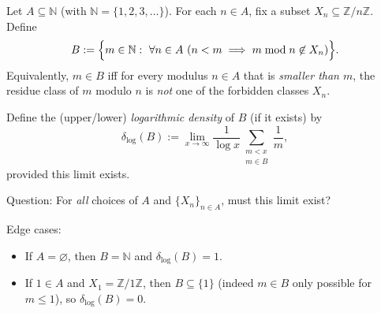 Let $A\subseteq\mathbb{N}$ (with $\mathbb{N}=\{1,2,3,\dots\}$). For each $n\in A$, fix a subset $X_n\subseteq \mathbb{Z}/n\mathbb{Z}$.
Define
\[
B := \Bigl\{ m\in\mathbb{N}:\ \forall n\in A\ (n<m\implies m\bmod n\not\in X_n)\Bigr\}.
\]
Equivalently, $m\in B$ iff for every modulus $n\in A$ that is \emph{smaller than $m$}, the residue class of $m$ modulo $n$ is \emph{not} one of the forbidden classes $X_n$.

Define the (upper/lower) \emph{logarithmic density} of $B$ (if it exists) by
\[
\delta_{\log}(B) := \lim_{x\to\infty}\frac{1}{\log x}\sum_{\substack{m<x\\m\in B}}\frac{1}{m},
\]
provided this limit exists.

Question: For \emph{all} choices of $A$ and $\{X_n\}_{n\in A}$, must this limit exist?

Edge cases:
\begin{itemize}
\item If $A=\varnothing$, then $B=\mathbb{N}$ and $\delta_{\log}(B)=1$.
\item If $1\in A$ and $X_1=\mathbb{Z}/1\mathbb{Z}$, then $B\subseteq\{1\}$ (indeed $m\in B$ only possible for $m\le 1$), so $\delta_{\log}(B)=0$.
\end{itemize}
